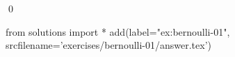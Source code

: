 
\begin{ex} 
  \label{ex:bernoulli-01}
  
  \qed
\end{ex} 
\begin{python0}
from solutions import *
add(label="ex:bernoulli-01",
    srcfilename='exercises/bernoulli-01/answer.tex') 
\end{python0}
